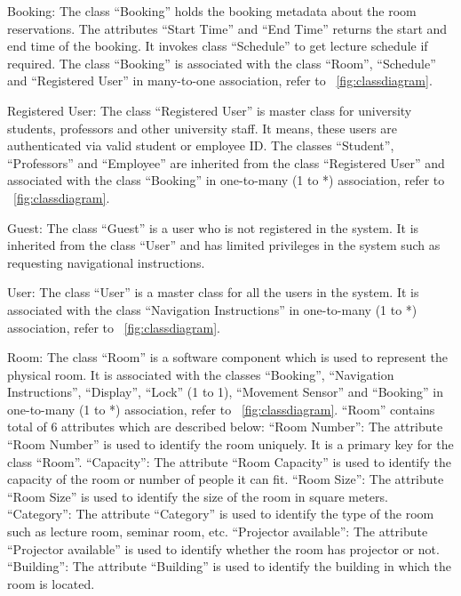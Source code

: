 \documentclass[conference,onecolumn]{IEEEtran}
\begin{document}
		Booking: The class ``Booking'' holds the booking metadata about the room reservations. The attributes ``Start Time'' and ``End Time'' returns the start and end time of the booking. It invokes class ``Schedule'' to get lecture schedule if required. The class ``Booking'' is associated with the class ``Room'', ``Schedule'' and ``Registered User'' in many-to-one association, refer to \figurename~\ref{fig:classdiagram}.

		Registered User: The class ``Registered User'' is master class for university students, professors and other university staff. It means, these users are authenticated via valid student or employee ID. The classes ``Student'', ``Professors'' and ``Employee'' are inherited from the class ``Registered User'' and associated with the class ``Booking'' in one-to-many (1 to *) association, refer to \figurename~\ref{fig:classdiagram}.

		Guest: The class ``Guest'' is a user who is not registered in the system. It is inherited from the class ``User'' and has limited privileges in the system such as requesting navigational instructions.

		User: The class ``User'' is a master class for all the users in the system. It is associated with the class ``Navigation Instructions'' in one-to-many (1 to *) association, refer to \figurename~\ref{fig:classdiagram}.

		Room: The class ``Room'' is a software component which is used to represent the physical room. It is associated with the classes ``Booking'', ``Navigation Instructions'', ``Display'', ``Lock'' (1 to 1), ``Movement Sensor'' and ``Booking'' in one-to-many (1 to *) association, refer to \figurename~\ref{fig:classdiagram}. ``Room'' contains total of 6 attributes which are described below:
		``Room Number'': The attribute ``Room Number'' is used to identify the room uniquely. It is a primary key for the class ``Room''.
		``Capacity'': The attribute ``Room Capacity'' is used to identify the capacity of the room or number of people it can fit.
		``Room Size'': The attribute ``Room Size'' is used to identify the size of the room in square meters.
		``Category'': The attribute ``Category'' is used to identify the type of the room such as lecture room, seminar room, etc.
		``Projector available'': The attribute ``Projector available'' is used to identify whether the room has projector or not.
		``Building'': The attribute ``Building'' is used to identify the building in which the room is located.


\end{document}
